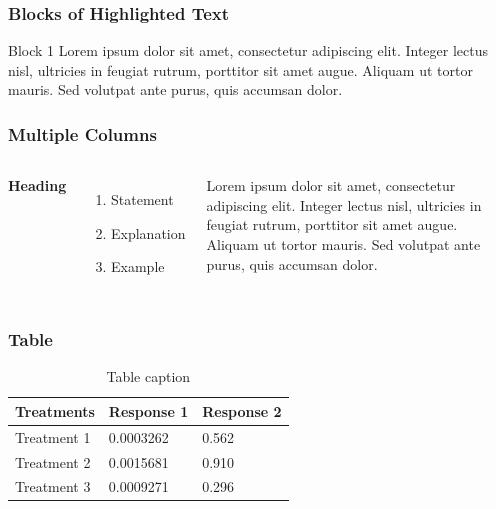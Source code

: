 \documentclass{beamer}
\begin{document}
\appendix

\iffalse

\begin{frame}
\frametitle{Blocks of Highlighted Text}
\begin{block}{Block 1}
Lorem ipsum dolor sit amet, consectetur adipiscing elit. Integer lectus nisl, ultricies in feugiat rutrum, porttitor sit amet augue. Aliquam ut tortor mauris. Sed volutpat ante purus, quis accumsan dolor.
\end{block}
\end{frame}


\begin{frame}
\frametitle{Multiple Columns}
\begin{columns}[c] %

\textbf{Heading}
\begin{enumerate}
\item Statement
\item Explanation
\item Example
\end{enumerate}

Lorem ipsum dolor sit amet, consectetur adipiscing elit. Integer lectus nisl, ultricies in feugiat rutrum, porttitor sit amet augue. Aliquam ut tortor mauris. Sed volutpat ante purus, quis accumsan dolor.

\end{columns}
\end{frame}

\begin{frame}
\frametitle{Table}
\begin{table}
\begin{tabular}{l l l}
\toprule
\textbf{Treatments} & \textbf{Response 1} & \textbf{Response 2}\\
\midrule
Treatment 1 & 0.0003262 & 0.562 \\
Treatment 2 & 0.0015681 & 0.910 \\
Treatment 3 & 0.0009271 & 0.296 \\
\bottomrule
\end{tabular}
\caption{Table caption}
\end{table}
\end{frame}


\end{document}
